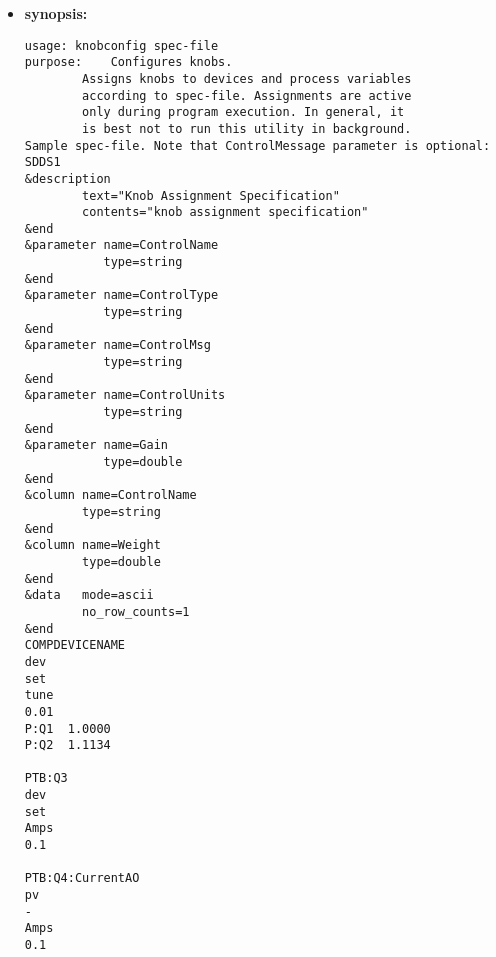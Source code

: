\begin{itemize}
\item {\bf synopsis:} 
%
%
\begin{verbatim}
usage: knobconfig spec-file
purpose:	Configures knobs.
		Assigns knobs to devices and process variables
		according to spec-file. Assignments are active
		only during program execution. In general, it 
		is best not to run this utility in background.
Sample spec-file. Note that ControlMessage parameter is optional:
SDDS1 
&description 
        text="Knob Assignment Specification" 
        contents="knob assignment specification" 
&end 
&parameter name=ControlName 
           type=string  
&end 
&parameter name=ControlType 
           type=string 
&end 
&parameter name=ControlMsg 
           type=string 
&end 
&parameter name=ControlUnits 
           type=string 
&end 
&parameter name=Gain 
           type=double 
&end 
&column name=ControlName 
        type=string 
&end 
&column name=Weight 
        type=double 
&end 
&data   mode=ascii 
        no_row_counts=1 
&end 
COMPDEVICENAME 
dev 
set 
tune 
0.01 
P:Q1  1.0000 
P:Q2  1.1134 
 
PTB:Q3 
dev 
set 
Amps 
0.1 
 
PTB:Q4:CurrentAO 
pv 
- 
Amps 
0.1 
 
\end{verbatim}


\end{itemize}
